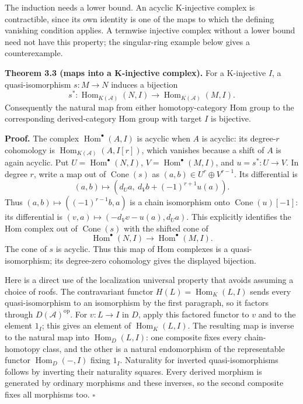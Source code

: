 \documentclass[
  english,
  11pt,
  a4paper,
]{article}
\begin{document}
The induction needs a lower bound. An acyclic K-injective complex is
contractible, since its own identity is one of the maps to which the
defining vanishing condition applies. A termwise injective complex
without a lower bound need not have this property; the singular-ring
example below gives a counterexample.

\textbf{Theorem 3.3 (maps into a K-injective complex).} For a
K-injective \(I\), a quasi-isomorphism \(s:M\to N\) induces a bijection
\[s^*:\operatorname{Hom}_{K(\mathcal A)}(N,I)
\longrightarrow\operatorname{Hom}_{K(\mathcal A)}(M,I).\] Consequently
the natural map from either homotopy-category Hom group to the
corresponding derived-category Hom group with target \(I\) is bijective.

\textbf{Proof.} The complex \(\operatorname{Hom}^\bullet(A,I)\) is
acyclic when \(A\) is acyclic: its degree-\(r\) cohomology is
\(\operatorname{Hom}_{K(\mathcal A)}(A,I[r])\), which vanishes because a
shift of \(A\) is again acyclic. Put
\(U=\operatorname{Hom}^\bullet(N,I)\),
\(V=\operatorname{Hom}^\bullet(M,I)\), and \(u=s^*:U\to V\). In degree
\(r\), write a map out of \(\operatorname{Cone}(s)\) as
\((a,b)\in U^r\oplus V^{r-1}\). Its differential is
\[(a,b)\longmapsto (d_Ua,\ d_Vb+(-1)^{r+1}u(a)).\] Thus
\((a,b)\mapsto((-1)^{r-1}b,a)\) is a chain isomorphism onto
\(\operatorname{Cone}(u)[-1]\): its differential is
\((v,a)\mapsto(-d_Vv-u(a),d_Ua)\). This explicitly identifies the Hom
complex out of \(\operatorname{Cone}(s)\) with the shifted cone of
\[\operatorname{Hom}^\bullet(N,I)\longrightarrow
\operatorname{Hom}^\bullet(M,I).\] The cone of \(s\) is acyclic. Thus
this map of Hom complexes is a quasi-isomorphism; its degree-zero
cohomology gives the displayed bijection.

Here is a direct use of the localization universal property that avoids
assuming a choice of roofs. The contravariant functor
\(H(L)=\operatorname{Hom}_K(L,I)\) sends every quasi-isomorphism to an
isomorphism by the first paragraph, so it factors through
\(D(\mathcal A)^{\mathrm{op}}\). For \(v:L\to I\) in \(D\), apply this
factored functor to \(v\) and to the element \(1_I\); this gives an
element of \(\operatorname{Hom}_K(L,I)\). The resulting map is inverse
to the natural map into \(\operatorname{Hom}_D(L,I)\): one composite
fixes every chain-homotopy class, and the other is a natural
endomorphism of the representable functor \(\operatorname{Hom}_D(-,I)\)
fixing \(1_I\). Naturality for inverted quasi-isomorphisms follows by
inverting their naturality squares. Every derived morphism is generated
by ordinary morphisms and these inverses, so the second composite fixes
all morphisms too. \(\square\)
\end{document}
